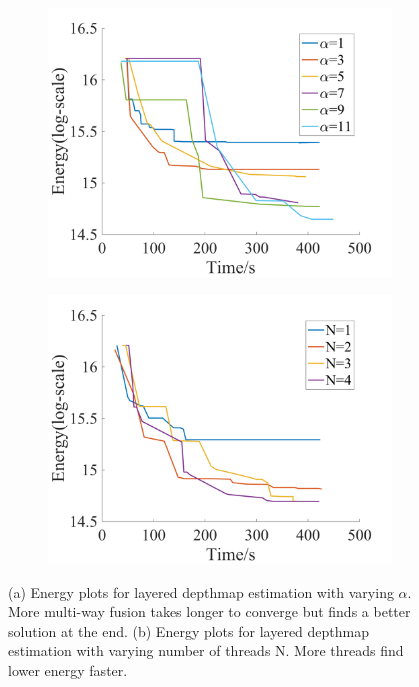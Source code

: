 \begin{figure}[!h]
  \centering
  \begin{subfigure}[b]{0.49\columnwidth}
    \centering
    \includegraphics[width=\columnwidth]{figure/layered_depthmap_by_alpha.png}
    \caption{}
    \label{fig:optical_flow_by_alpha}
  \end{subfigure}  
  \begin{subfigure}[b]{0.49\columnwidth}
    \centering
    \includegraphics[width=\columnwidth]{figure/layered_depthmap_by_N.png}
    \caption{}
    \label{fig:optical_flow_by_N}
  \end{subfigure}
  \caption{(a) Energy plots for layered depthmap estimation with varying
    $\alpha$. More multi-way fusion takes longer to converge but finds a better   
    solution at the end. (b) Energy plots for layered depthmap estimation with varying number of threads N. More threads find lower energy faster.}
  \label{fig:layered_depthmap_by_alpha_N}
\end{figure}

